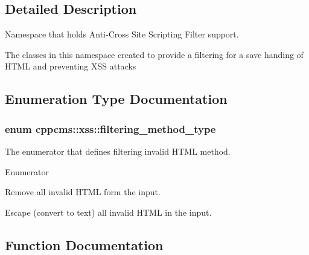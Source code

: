 \subsection{Detailed Description}
Namespace that holds Anti-\/\+Cross Site Scripting Filter support. 

The classes in this namespace created to provide a filtering for a save handing of H\+T\+ML and preventing X\+SS attacks 

\subsection{Enumeration Type Documentation}
\subsubsection[{filtering\+\_\+method\+\_\+type}]{\setlength{\rightskip}{0pt plus 5cm}enum {\bf cppcms\+::xss\+::filtering\+\_\+method\+\_\+type}}\label{namespacecppcms_1_1xss_a78682352617884a1eb716ebf2a62343d}


The enumerator that defines filtering invalid H\+T\+ML method. 

\begin{Desc}
\item[Enumerator]\par
\begin{description}
\item[{\em 
remove\+\_\+invalid\label{namespacecppcms_1_1xss_a78682352617884a1eb716ebf2a62343da5df42d96e38bf54cc8daa31ba8ab7e44}
}]Remove all invalid H\+T\+ML form the input. \item[{\em 
escape\+\_\+invalid\label{namespacecppcms_1_1xss_a78682352617884a1eb716ebf2a62343dae660331d92070806a4a0bd20ebeee94f}
}]Escape (convert to text) all invalid H\+T\+ML in the input. \end{description}
\end{Desc}


\subsection{Function Documentation}
